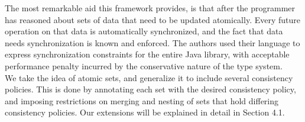 
The most remarkable aid this framework provides, is that after the programmer
has reasoned about sets of data that need to be updated atomically. Every
future operation on that data is automatically synchronized, and the fact that
data needs synchronization is known and enforced. The authors used their language to express
synchronization constraints for the entire Java library, with acceptable
performance penalty incurred by the conservative nature of the type system. \\




%
We take the idea of atomic sets, and generalize it to include several
consistency policies. This is done by annotating each set with the desired
consistency policy, and imposing restrictions on merging and nesting of sets that
hold differing consistency policies. Our extensions will be explained in detail
in Section 4.1.

